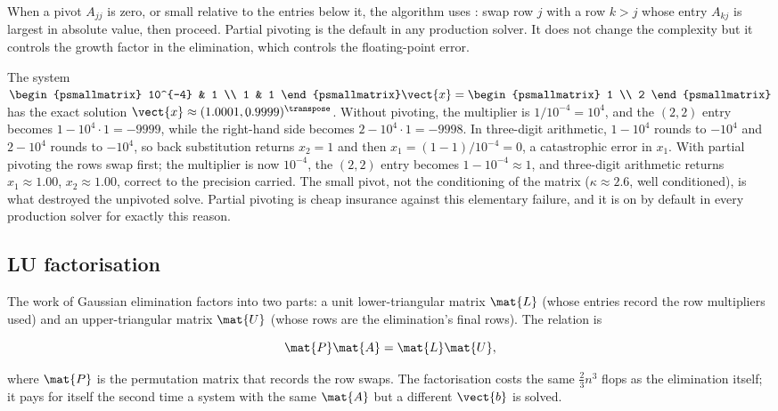 When a pivot $A_{jj}$ is zero, or small relative to the entries
below it, the algorithm uses : swap row
$j$ with a row $k > j$ whose entry $A_{kj}$ is largest in absolute
value, then proceed. Partial pivoting is the default in any
production solver. It does not change the complexity but it
controls the growth factor in the elimination, which controls the
floating-point error.

\begin{example}
The system $\begin{psmallmatrix} 10^{-4} & 1 \\ 1 & 1
\end{psmallmatrix}\vect{x} = \begin{psmallmatrix} 1 \\ 2
\end{psmallmatrix}$ has the exact solution $\vect{x} \approx
(1.0001, 0.9999)^{\transpose}$. Without pivoting, the multiplier is
$1/10^{-4} = 10^{4}$, and the $(2,2)$ entry becomes $1 - 10^{4}
\cdot 1 = -9999$, while the right-hand side becomes $2 - 10^{4}
\cdot 1 = -9998$. In three-digit arithmetic, $1 - 10^{4}$ rounds to
$-10^{4}$ and $2 - 10^{4}$ rounds to $-10^{4}$, so back substitution
returns $x_{2} = 1$ and then $x_{1} = (1 - 1)/10^{-4} = 0$, a
catastrophic error in $x_{1}$. With partial pivoting the rows swap
first; the multiplier is now $10^{-4}$, the $(2,2)$ entry becomes
$1 - 10^{-4} \approx 1$, and three-digit arithmetic returns $x_{1}
\approx 1.00$, $x_{2} \approx 1.00$, correct to the precision
carried. The small pivot, not the conditioning of the matrix
($\kappa \approx 2.6$, well conditioned), is what destroyed the
unpivoted solve. Partial pivoting is cheap insurance against this
elementary failure, and it is on by default in every production
solver for exactly this reason.
\end{example}

\subsection{LU factorisation}

The work of Gaussian elimination factors into two parts: a unit
lower-triangular matrix $\mat{L}$ (whose entries record the row
multipliers used) and an upper-triangular matrix $\mat{U}$ (whose
rows are the elimination's final rows). The relation is

\[
\mat{P}\mat{A} = \mat{L}\mat{U},
\]

where $\mat{P}$ is the permutation matrix that records the row
swaps. The factorisation costs the same $\tfrac{2}{3}n^{3}$ flops
as the elimination itself; it pays for itself the second time a
system with the same $\mat{A}$ but a different $\vect{b}$ is
solved.

